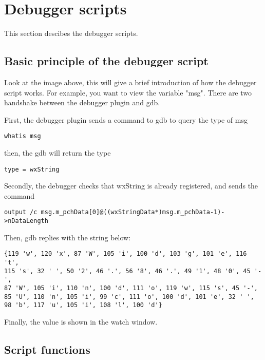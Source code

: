 \section{Debugger scripts}\label{sec:debugger_scripts}
This section descibes the debugger scripts.
\subsection{Basic principle of the debugger script}


Look at the image above, this will give a brief introduction of how the debugger script works. For example, you want to view the variable "msg". There are two handshake between the debugger plugin and gdb.

First, the debugger plugin sends a command to gdb to query the type of msg

\begin{lstlisting}
whatis msg
\end{lstlisting}

then, the gdb will return the type

\begin{lstlisting}
type = wxString
\end{lstlisting}

Secondly, the debugger checks that wxString is already registered, and sends the command

\begin{lstlisting}
output /c msg.m_pchData[0]@((wxStringData*)msg.m_pchData-1)->nDataLength
\end{lstlisting}

Then, gdb replies with the string below:

\begin{lstlisting}
{119 'w', 120 'x', 87 'W', 105 'i', 100 'd', 103 'g', 101 'e', 116 't', 
115 's', 32 ' ', 50 '2', 46 '.', 56 '8', 46 '.', 49 '1', 48 '0', 45 '-', 
87 'W', 105 'i', 110 'n', 100 'd', 111 'o', 119 'w', 115 's', 45 '-', 
85 'U', 110 'n', 105 'i', 99 'c', 111 'o', 100 'd', 101 'e', 32 ' ', 
98 'b', 117 'u', 105 'i', 108 'l', 100 'd'}
\end{lstlisting}

Finally, the value is shown in the watch window.

\subsection{Script functions}

